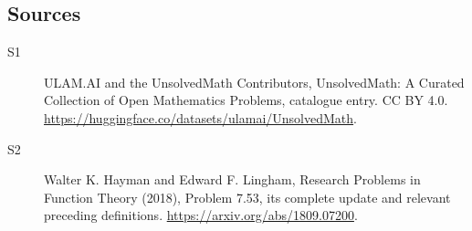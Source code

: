 \documentclass[11pt]{article}
\begin{document}
\subsection{Sources}
\begin{description}
\item[\hypertarget{source:statement:1}{S1}] ULAM.AI and the UnsolvedMath Contributors, UnsolvedMath: A Curated Collection of Open Mathematics Problems, catalogue entry. CC BY 4.0. \url{https://huggingface.co/datasets/ulamai/UnsolvedMath}.
\item[\hypertarget{source:statement:2}{S2}] Walter K. Hayman and Edward F. Lingham, Research Problems in Function Theory (2018), Problem 7.53, its complete update and relevant preceding definitions. \url{https://arxiv.org/abs/1809.07200}.
\end{description}
\label{end:statement}
\end{document}
